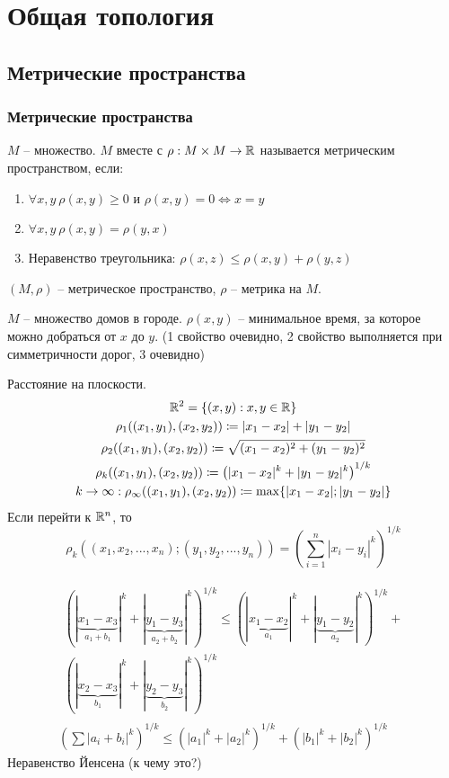 \documentclass[main]{subfiles}
\begin{document}
\part*{Общая топология}
\chapter{Метрические пространства}
\section{Метрические пространства}
\begin{definition}
    $M$ -- множество. $M$ вместе с $\rho: M \times M \to \mathbb{R}$ называется
    метрическим пространством, если:
    \begin{enumerate}
        \item $\forall x,y \ \rho(x,y) \ge 0$ и $\rho(x,y) = 0 \Leftrightarrow x=y$
        \item $\forall x,y \ \rho(x,y) = \rho(y,x)$
        \item Неравенство треугольника: $\rho(x,z) \le \rho(x,y) + \rho(y,z)$
    \end{enumerate}
    $(M, \rho)$ -- метрическое пространство, $\rho$ -- метрика на $M$.
\end{definition}
\begin{example}
    $M$ -- множество домов в городе. $\rho(x,y)$ -- минимальное время,
    за которое можно добраться от $x$ до $y$.
    (1 свойство очевидно, 2 свойство выполняется при симметричности дорог, 3 очевидно)
\end{example}
\begin{example}
    Расстояние на плоскости.
    \begin{gather*}
        \mathbb{R}^2 = \{(x,y):x,y \in \mathbb{R}\}\\
        \rho_1((x_1, y_1), (x_2, y_2)) \coloneqq |x_1 - x_2| + |y_1 - y_2|\\
        \rho_2((x_1, y_1), (x_2, y_2)) \coloneqq \sqrt{(x_1 - x_2)^2 + (y_1 - y_2)^2}\\
        \rho_k((x_1, y_1), (x_2, y_2)) \coloneqq \left(|x_1 - x_2|^k + |y_1 - y_2|^k\right)^{1/k}\\
        k \to \infty: \rho_\infty((x_1, y_1), (x_2, y_2)) \coloneqq \max\{|x_1 - x_2|; |y_1 - y_2|\}
    \end{gather*}
    Если перейти к $\mathbb{R}^n$, то
    \[\rho_k((x_1,x_2,..., x_n); (y_1, y_2,...,y_n)) = \left(\sum_{i=1}^n |x_i-y_i|^k\right)^{1/k}\]
\end{example}
\begin{gather*}
    \begin{multlined}
        \left(|\underbrace{x_1-x_3}_{a_1+b_1}|^k + |\underbrace{y_1-y_3}_{a_2+b_2}|^k\right)^{1/k} \le
        \left(|\underbrace{x_1-x_2}_{a_1}|^k + |\underbrace{y_1-y_2}_{a_2}|^k\right)^{1/k}+\\
        \left(|\underbrace{x_2-x_3}_{b_1}|^k + |\underbrace{y_2-y_3}_{b_2}|^k\right)^{1/k}
    \end{multlined}\\
    \left(\sum|a_i+b_i|^k\right)^{1/k} \le \left(|a_1|^k + |a_2|^k\right)^{1/k} + \left(|b_1|^k + |b_2|^k\right)^{1/k}
\end{gather*}
Неравенство Йенсена (к чему это?)
\end{document}
